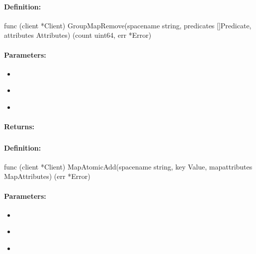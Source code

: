 \paragraph{Definition:}
\begin{gocode}
func (client *Client) GroupMapRemove(spacename string, predicates []Predicate, attributes Attributes) (count uint64, err *Error)
\end{gocode}

\paragraph{Parameters:}
\begin{itemize}[noitemsep]
\item {}\\

\item {}\\

\item {}\\

\end{itemize}

\paragraph{Returns:}


\pagebreak
\subsubsection{}
\label{api:Go:MapAtomicAdd}


\paragraph{Definition:}
\begin{gocode}
func (client *Client) MapAtomicAdd(spacename string, key Value, mapattributes MapAttributes) (err *Error)
\end{gocode}

\paragraph{Parameters:}
\begin{itemize}[noitemsep]
\item {}\\

\item {}\\

\item {}\\

\end{itemize}

